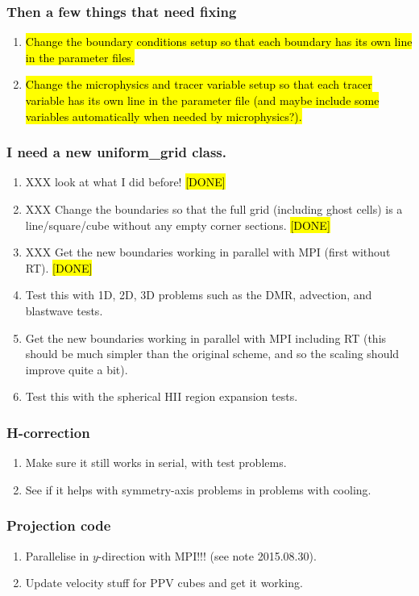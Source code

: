 \documentclass[a4paper,11pt]{article}
\begin{document}
\subsubsection{Then a few things that need fixing}
\begin{enumerate}
\item \hl{Change the boundary conditions setup so that each boundary has its own line in the parameter files.}
\item \hl{Change the microphysics and tracer variable setup so that each tracer variable has its own line in the parameter file (and maybe include some variables automatically when needed by microphysics?).}
\end{enumerate}

\subsubsection{I need a new uniform\_grid class.}
\begin{enumerate}
\item XXX look at what I did before!  \hl{[DONE]}
\item XXX Change the boundaries so that the full grid (including ghost cells) is a line/square/cube without any empty corner sections.  \hl{[DONE]}
\item XXX Get the new boundaries working in parallel with MPI (first without RT).  \hl{[DONE]}
\item Test this with 1D, 2D, 3D problems such as the DMR, advection, and blastwave tests.
\item Get the new boundaries working in parallel with MPI including RT (this should be much simpler than the original scheme, and so the scaling should improve quite a bit).
\item Test this with the spherical HII region expansion tests.
\end{enumerate}

\subsubsection{H-correction}
\begin{enumerate}
\item Make sure it still works in serial, with test problems.
\item See if it helps with symmetry-axis problems in problems with cooling.
\end{enumerate}


\subsubsection{Projection code}
\begin{enumerate}
\item Parallelise in $y$-direction with MPI!!! (see note 2015.08.30).
\item Update velocity stuff for PPV cubes and get it working.
\end{enumerate}
\end{document}
